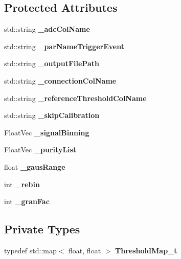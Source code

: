 \subsection*{Protected Attributes}
\begin{DoxyCompactItemize}
\item 
std\-::string {\bfseries \-\_\-adc\-Col\-Name}\label{classCALICE_1_1multiCalibrator_a2c6dadc7bd856f48ebabb2ff1f3eb24d}

\item 
std\-::string {\bfseries \-\_\-par\-Name\-Trigger\-Event}\label{classCALICE_1_1multiCalibrator_a9dcf1a278390cf22a27f873b03ecaf42}

\item 
std\-::string {\bfseries \-\_\-output\-File\-Path}\label{classCALICE_1_1multiCalibrator_a243d6d66340eba9a2cadfa2387b20c0f}

\item 
std\-::string {\bfseries \-\_\-connection\-Col\-Name}\label{classCALICE_1_1multiCalibrator_acd73797da60310a0a4bcfd495204a855}

\item 
std\-::string {\bfseries \-\_\-reference\-Threshold\-Col\-Name}\label{classCALICE_1_1multiCalibrator_ac3f8d6ece5b4b56d26a9864ee0618ce5}

\item 
std\-::string {\bfseries \-\_\-skip\-Calibration}\label{classCALICE_1_1multiCalibrator_af3bb02c62940673fb59d5250cc294d6d}

\item 
Float\-Vec {\bfseries \-\_\-signal\-Binning}\label{classCALICE_1_1multiCalibrator_aa88fe075d6603ee3c78158bd742b91e4}

\item 
Float\-Vec {\bfseries \-\_\-purity\-List}\label{classCALICE_1_1multiCalibrator_a8d8b4bb7da03c22ddf35a8f94c7bb1a0}

\item 
float {\bfseries \-\_\-gaus\-Range}\label{classCALICE_1_1multiCalibrator_a7fc0a223ac7ef8119b3b0a987eb44adc}

\item 
int {\bfseries \-\_\-rebin}\label{classCALICE_1_1multiCalibrator_a007fb7a565ad1ec0eb2719981203f8fe}

\item 
int {\bfseries \-\_\-gran\-Fac}\label{classCALICE_1_1multiCalibrator_a5dcaedfa4e29bad191bc22016eca0355}

\end{DoxyCompactItemize}
\subsection*{Private Types}
\begin{DoxyCompactItemize}
\item 
typedef std\-::map$<$ float, float $>$ {\bfseries Threshold\-Map\-\_\-t}\label{classCALICE_1_1multiCalibrator_a35b415a32f3bf4f78a4bb5adc3f96470}

\end{DoxyCompactItemize}
